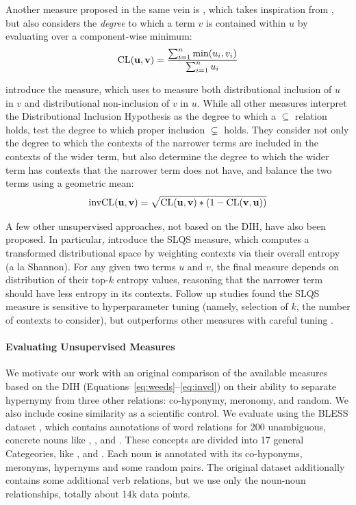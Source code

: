 Another measure proposed in the same vein is {\Clarke} \cite{clarke:2009:gems},
which takes inspiration from , but also considers
the {\em degree} to which a term $v$ is contained within $u$ by evaluating
over a component-wise minimum:
\begin{equation}
  \mbox{CL}({\mathbf{u}}, {\mathbf{v}}) = \frac{\sum_{i=1}^n \mbox{min}(u_i, v_i)}{\sum_{i=1}^n u_i}
\end{equation}

 introduce the \invCL measure, which uses \Clarke to
measure both distributional inclusion of $u$ in $v$ and distributional
non-inclusion of $v$ in $u$. While all other measures interpret the
Distributional Inclusion Hypothesis as the degree to which a $\subseteq$
relation holds,  test the degree to which proper
inclusion $\subsetneq$ holds. They consider not only the degree to which the
contexts of the narrower terms are included in the contexts of the wider term,
but also determine the degree to which the wider term has contexts that the
narrower term does not have, and balance the two terms using a geometric mean:
\begin{equation}
  \mbox{invCL}({\mathbf{u}}, {\mathbf{v}}) = \sqrt{\mbox{CL}({\mathbf{u}}, {\mathbf{v}}) * (1 - \mbox{CL}({\mathbf{v}}, {\mathbf{u}}))}
  \label{eq:invcl}
\end{equation}

A few other unsupervised approaches, not based on the DIH, have also been
proposed. In particular,  introduce the SLQS measure,
which computes a transformed distributional space by weighting contexts via
their overall entropy (a la Shannon). For any given two terms $u$ and $v$,
the final measure depends on distribution of their top-$k$ entropy values,
reasoning that the narrower term should have less entropy in its contexts.
Follow up studies found the SLQS measure is sensitive to hyperparameter tuning
(namely, selection of $k$, the number of contexts to consider), but outperforms
other measures with careful tuning \cite{shwartz:2017:eacl}.

\paragraph{Evaluating Unsupervised Measures}

We motivate our work with an original comparison of the available measures
based on the DIH (Equations~\ref{eq:weeds}--\ref{eq:invcl}) on their ability to
separate hypernymy from three other relations: co-hyponymy, meronomy, and
random. We also include cosine similarity as a scientific control.
We evaluate using the BLESS dataset \cite{baroni:2011:gems},
which contains annotations of word relations for 200 unambiguous, concrete
nouns like , , and . These concepts are divided
into 17 general Categeories, like ,  and
. Each noun is annotated with its co-hyponyms, meronyms,
hypernyms and some random pairs. The original dataset additionally contains
some additional verb relations, but we use only the noun-noun relationships,
totally about 14k data points.

